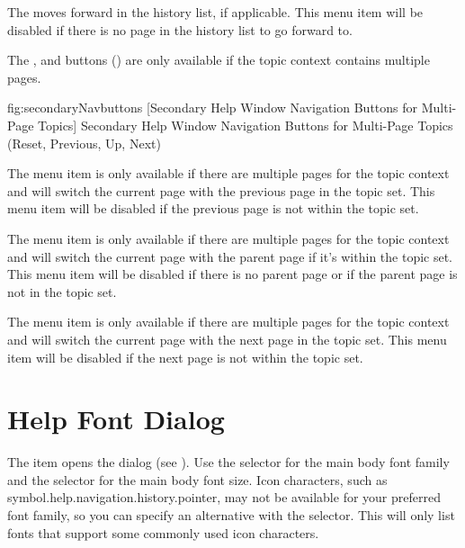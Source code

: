 The  moves forward in the
history list, if applicable. This menu item will be disabled if
there is no page in the history list to go forward to.

The , 
 and
 buttons
() are only available if the
topic context contains multiple pages.

\FloatFig
{fig:secondaryNavbuttons}
{%
}
[Secondary Help Window Navigation Buttons for Multi-Page Topics]
{Secondary Help Window Navigation Buttons for Multi-Page Topics
  (Reset, Previous, Up, Next)}


The  menu item is only
available if there are multiple pages for the topic context and will
switch the current page with the previous page in the topic set.
This menu item will be disabled if the previous page is not within the
topic set.


The  menu item is only
available if there are multiple pages for the topic context and will
switch the current page with the parent page if it's within the topic set.
This menu item will be disabled if there is no parent page or if the
parent page is not in the topic set.


The  menu item is only
available if there are multiple pages for the topic context and will
switch the current page with the next page in the topic set.
This menu item will be disabled if the next page is not within the
topic set.

\section{Help Font Dialog}
\label{sec:helpfontdialog}

The  item opens the
 dialog (see
). Use the
 selector for the main body font
family and the  selector for the
main body font size. Icon characters, such as
\gls{symbol.help.navigation.history.pointer}, may not be available
for your preferred font family, so you can specify an alternative
with the  selector. This
will only list fonts that support some commonly used icon
characters.

